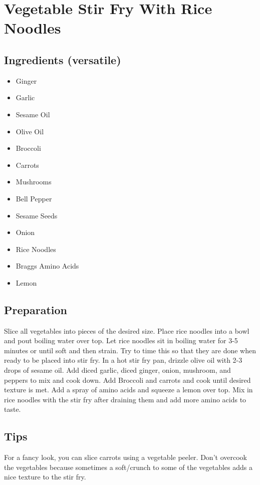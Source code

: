 \thispagestyle{fancy}
\section{Vegetable Stir Fry With Rice Noodles}
\AddToShipoutPicture*{\StirFryRiceNoodles}

\subsection*{Ingredients (versatile)}
\begin{multicols}{3}
	\begin{itemize}
		\item Ginger
		\item Garlic
		\item Sesame Oil
		\item Olive Oil
		\item Broccoli
		\item Carrots
		\item Mushrooms
		\item Bell Pepper
		\item Sesame Seeds
		\item Onion
		\item Rice Noodles
		\item Braggs Amino Acids
		\item Lemon
	\end{itemize}
\end{multicols}

\subsection*{Preparation}

Slice all vegetables into pieces of the desired size. Place rice noodles into a bowl and pout boiling water over top. Let rice noodles sit in boiling water for 3-5 minutes or until soft and then strain. Try to time this so that they are done when ready to be placed into stir fry. In a hot stir fry pan, drizzle olive oil with 2-3 drops of sesame oil. Add diced garlic, diced ginger, onion, mushroom, and peppers to mix and cook down. Add Broccoli and carrots and cook until desired texture is met. Add a spray of amino acids and squeeze a lemon over top. Mix in rice noodles with the stir fry after draining them and add more amino acids to taste. 

\subsection*{Tips}

For a fancy look, you can slice carrots using a vegetable peeler. Don't overcook the vegetables because sometimes a soft/crunch to some of the vegetables adds a nice texture to the stir fry.